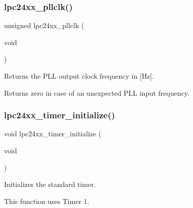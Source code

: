\subsubsection{\texorpdfstring{lpc24xx\_pllclk()}{lpc24xx\_pllclk()}}
{\footnotesize\ttfamily unsigned lpc24xx\+\_\+pllclk (\begin{DoxyParamCaption}\item[{void}]{ }\end{DoxyParamCaption})}



Returns the P\+LL output clock frequency in \mbox{[}Hz\mbox{]}. 

Returns zero in case of an unexpected P\+LL input frequency. \mbox{\label{group__lpc24xx__clock_gab3adf1ba12bf721c8229c9f473099d87}} 
\subsubsection{\texorpdfstring{lpc24xx\_timer\_initialize()}{lpc24xx\_timer\_initialize()}}
{\footnotesize\ttfamily void lpc24xx\+\_\+timer\+\_\+initialize (\begin{DoxyParamCaption}\item[{void}]{ }\end{DoxyParamCaption})}



Initializes the standard timer. 

This function uses Timer 1. 